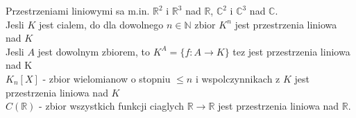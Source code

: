 \documentclass{article}
\newcommand{\R}{\mathbb{R}}
\newcommand{\N}{\mathbb{N}}
\newcommand{\C}{\mathbb{C}}
\begin{document}
    Przestrzeniami liniowymi sa m.in. $\R^2$ i $\R^3$ nad $\R$, $\C^2$ i $\C^3$ nad $\C$.\medskip\\
    Jesli $K$ jest cialem, do dla dowolnego $n\in\N$ zbior $K^n$ jest przestrzenia liniowa nad $K$\smallskip\\
    Jesli $A$ jest dowolnym zbiorem, to $K^A =\{f:A\to K\}$ tez jest przestrzenia liniowa nad K\smallskip\\
    $K_n[X]$ - zbior wielomianow o stopniu $\leq n$ i wspolczynnikach z $K$ jest przestrzenia liniowa nad $K$\smallskip\\
    $C(\R)$ - zbior wszystkich funkcji ciaglych $\R\to\R$ jest przestrzenia liniowa nad $\R$.
    
\end{document}
